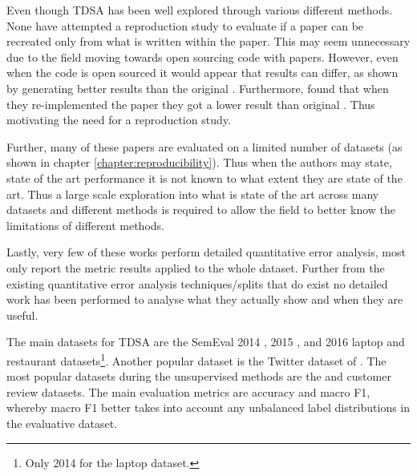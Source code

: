 Even though TDSA has been well explored through various different methods. None have attempted a reproduction study to evaluate if a paper can be recreated only from what is written within the paper. This may seem unnecessary due to the field moving towards open sourcing code with papers. However, even when the code is open sourced it would appear that results can differ, as shown by \citet{chen-etal-2017-recurrent} generating better results than the original \citep{tang-etal-2016-effective}. Furthermore, \citet{tay2018learning} found that when they re-implemented the paper they got a lower result than original \citep{tang-etal-2016-effective}. Thus motivating the need for a reproduction study.

Further, many of these papers are evaluated on a limited number of datasets (as shown in chapter \ref{chapter:reproducibility}). Thus when the authors may state, state of the art performance it is not known to what extent they are state of the art. Thus a large scale exploration into what is state of the art across many datasets and different methods is required to allow the field to better know the limitations of different methods.

Lastly, very few of these works perform detailed quantitative error analysis, most only report the metric results applied to the whole dataset. Further from the existing quantitative error analysis techniques/splits \citep{nguyen-shirai-2015-phrasernn, wang-etal-2017-tdparse, zhang-etal-2019-aspect} that do exist no detailed work has been performed to analyse what they actually show and when they are useful. 

The main datasets for TDSA are the SemEval 2014 \citep{pontiki-etal-2014-semeval}, 2015 \citep{pontiki-etal-2015-semeval}, and 2016 \citep{pontiki-etal-2016-semeval} laptop and restaurant datasets\footnote{Only 2014 for the laptop dataset.}. Another popular dataset is the Twitter dataset of \citet{dong-etal-2014-adaptive}. The most popular datasets during the unsupervised methods are the \citet{hu2004mining} and \citet{ding2008holistic} customer review datasets. The main evaluation metrics are accuracy and macro F1, whereby macro F1 better takes into account any unbalanced label distributions in the evaluative dataset. 


